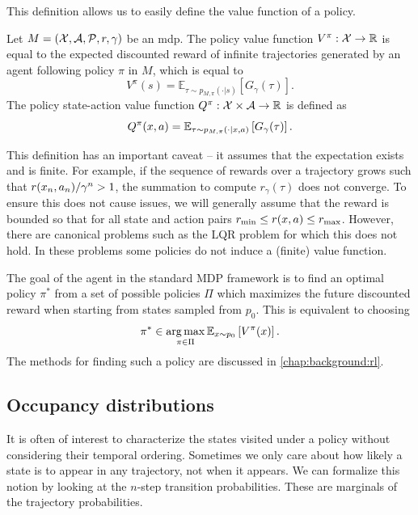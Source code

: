 This definition allows us to easily define the value function of a policy.

\begin{definition}
    Let $M = (\mathcal{X},\mathcal{A},\mathcal{P},r,\gamma)$ be an \ac{mdp}.
    The policy value function $V^\pi: \mathcal{X} \rightarrow \mathbb{R}$ is equal to the expected discounted reward of infinite trajectories generated by an agent following policy $\pi$ in $M$, which is equal to $$V^\pi(s) = \mathbb{E}_{\tau \sim p_{M,\pi}(\cdot|s)} \left[ G_\gamma(\tau)\right].$$
    The policy state-action value function $Q^\pi: \mathcal{X} \times \mathcal{A} \rightarrow \mathbb{R}$ is defined as $$Q^\pi(x,a) = \mathbb{E}_{\tau \sim p_{M,\pi}(\cdot|x,a)} \left[ G_\gamma(\tau)\right].$$
\end{definition}

This definition has an important caveat -- it assumes that the expectation exists and is finite.
For example, if the sequence of rewards over a trajectory grows such that $r(x_n,a_n)/\gamma^n > 1$, the summation to compute $r_\gamma(\tau)$ does not converge.
To ensure this does not cause issues, we will generally assume that the reward is bounded so that for all state and action pairs $r_{\min} \leq r(x,a) \leq r_{\max}$.
However, there are canonical problems such as the LQR problem for which this does not hold.
In these problems some policies do not induce a (finite) value function.

The goal of the agent in the standard MDP framework is to find an optimal policy $\pi^*$ from a set of possible policies $\Pi$ which maximizes the future discounted reward when starting from states sampled from $p_0$.
This is equivalent to choosing $$\pi^* \in \operatorname*{arg\,max}_{\pi \in \Pi} \mathbb{E}_{x \sim p_0}\left[V^\pi(x)\right].$$
The methods for finding such a policy are discussed in \autoref{chap:background:rl}.

\subsection{Occupancy distributions}

It is often of interest to characterize the states visited under a policy without considering their temporal ordering.
Sometimes we only care about how likely a state is to appear in any trajectory, not when it appears.
We can formalize this notion by looking at the $n$-step transition probabilities.
These are marginals of the trajectory probabilities.

